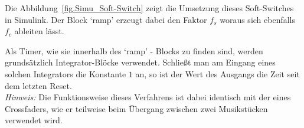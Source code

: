 Die Abbildung~\ref{fig.Simu_Soft-Switch} zeigt die Umsetzung dieses Soft-Switches in Simulink. Der Block `ramp' erzeugt dabei den Faktor $f_s$ woraus sich ebenfalls $f_c$ ableiten lässt.

Als Timer, wie sie innerhalb des `ramp' - Blocks zu finden sind, werden grund\-sätz\-lich Integrator-Blöcke verwendet. Schließt man am Eingang eines solchen Integrators die Konstante $1$ an, so ist der Wert des Ausgangs die Zeit seit dem letzten Reset.\\

\textit{Hinweis:} Die Funktionsweise dieses Verfahrens ist dabei identisch mit der eines Crossfaders, wie er teilweise beim Übergang zwischen zwei Musikstücken verwendet wird.

